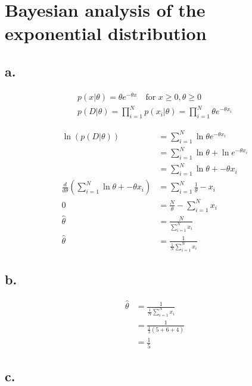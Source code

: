 \documentclass{article}
\begin{document}
\section{Bayesian analysis of the exponential distribution}

\subsection{a.}

\begin{gather*}
  p(x|\theta) = \theta e^{-\theta x} \quad \text{for } x \ge 0, \theta
  \ge 0 \\
  p(D|\theta) = \prod_{i=1}^N p(x_i|\theta) = \prod_{i=1}^N \theta
  e^{-\theta x_i}
\end{gather*}

\begin{align*}
  \ln (p(D|\theta)) &= \sum_{i=1}^N \ln \theta e^{-\theta x_i} \\
                    &= \sum_{i=1}^N \ln \theta + \ln e^{-\theta x_i}
  \\
                    &= \sum_{i=1}^N \ln \theta + -\theta x_i \\
  \frac{d}{d\theta} (\sum_{i=1}^N \ln \theta + -\theta x_i) &=
                                                              \sum_{i=1}^N
                                                              \frac{1}{\theta}
                                                              - x_i \\
  0 &= \frac{N}{\theta} - \sum_{i=1}^N x_i \\
  \hat{\theta} &= \frac{N}{\sum_{i=1}^N x_i} \\
  \hat{\theta} &= \frac{1}{\frac{1}{N} \sum_{i=1}^N x_i}
\end{align*}

\subsection{b.}
\begin{align*}
  \hat{\theta} &= \frac{1}{\frac{1}{N} \sum_{i=1}^N x_i} \\
               &= \frac{1}{\frac{1}{3}(5+6+4)} \\
               &= \frac{1}{5}
\end{align*}

\subsection{c.}
\end{document}
